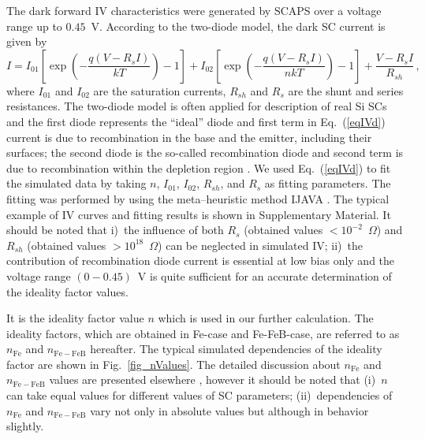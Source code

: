 \documentclass[num-refs]{wiley-article} %
\begin{document}
The dark forward IV characteristics were generated by SCAPS over a voltage range up to $0.45$~V.
According to the two-diode model, the dark SC current is given by \citep{Breitenstein2013}
\begin{equation}
\label{eqIVd}
    I=I_{01}\left[\exp\left(-\frac{q(V-R_sI)}{kT}\right)-1\right]
      + I_{02}\left[\exp\left(-\frac{q(V-R_sI)}{nkT}\right)-1\right]
      +\frac{V-R_sI}{R_{sh}}\,,
\end{equation}
where
$I_{01}$ and $I_{02}$ are the saturation currents,
$R_{sh}$ and $R_s$ are the shunt and series resistances.
The two-diode model is often applied for description of real Si SCs
and the first diode represents the ``ideal'' diode and
first term in Eq.~(\ref{eqIVd})
current is due to recombination in the base
and the emitter, including their surfaces;
the second diode is the so-called recombination diode
and second term is due to recombination within
the depletion region \citep{Breitenstein2013}.
We used Eq.~(\ref{eqIVd}) to fit the simulated data by taking $n$, $I_{01}$, $I_{02}$,
$R_{sh}$, and $R_s$ as fitting parameters.
The fitting was performed by using the meta--heuristic method IJAVA \cite{IJAVA}.
The typical example of IV curves and fitting results is shown
in Supplementary Material.
It should be noted that
i)~the influence of both $R_s$ (obtained values $<10^{-2}$~$\Omega$) and $R_{sh}$
(obtained values $>10^{18}$~$\Omega$) can be neglected in simulated IV;
ii)~the contribution of recombination diode current is essential at low bias only
and the voltage range $(0-0.45)$~V is quite sufficient for an accurate determination of the ideality factor values.

It is the ideality factor value $n$ which is used in our further calculation.
The ideality factors, which are obtained in  Fe-case and Fe-FeB-case,
are referred to as  $n_\mathrm{Fe}$ and $n_\mathrm{Fe-FeB}$ hereafter.
The typical simulated dependencies of  the ideality factor are shown in Fig.~\ref{fig_nValues}.
The detailed discussion about $n_\mathrm{Fe}$ and $n_\mathrm{Fe-FeB}$  values are presented elsewhere \cite{OlikhJPS},
however it should be noted that
(i)~$n$ can take equal values for different  values of SC parameters;
(ii)~dependencies of $n_\mathrm{Fe}$ and $n_\mathrm{Fe-FeB}$ vary not only in absolute values but although in behavior slightly.
\end{document}
